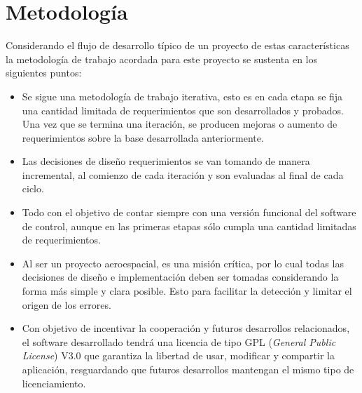 \documentclass[11pt,letterpaper]{article}
\begin{document}
\newpage
\section{Metodología}

Considerando el flujo de desarrollo típico de un proyecto de estas características la metodología de trabajo acordada para este proyecto se sustenta en los siguientes puntos:

\begin{itemize}
	\item Se sigue una metodología de trabajo iterativa, esto es en cada etapa se fija una cantidad limitada de requerimientos que son desarrollados y probados. Una vez que se termina una iteración, se producen mejoras o aumento de requerimientos sobre la base desarrollada anteriormente.
	
	\item Las decisiones de diseño  requerimientos se van tomando de manera incremental, al comienzo de cada iteración y son evaluadas al final de cada ciclo.
	
	\item Todo con el objetivo de contar siempre con una versión funcional del software de control, aunque en las primeras etapas sólo cumpla una cantidad limitadas de requerimientos.
	
	\item Al ser un proyecto aeroespacial, es una misión crítica, por lo cual todas las decisiones de diseño e implementación deben ser tomadas considerando la forma más simple y clara posible. Esto para facilitar la detección y limitar el origen de los errores.
	
	\item Con objetivo de incentivar la cooperación y futuros desarrollos relacionados, el software desarrollado tendrá una licencia de tipo GPL (\textit{General Public License}) V3.0 que garantiza la libertad de usar, modificar y compartir la aplicación, resguardando que futuros desarrollos mantengan el mismo tipo de licenciamiento.
	
\end{itemize}


% 	
\end{document}

